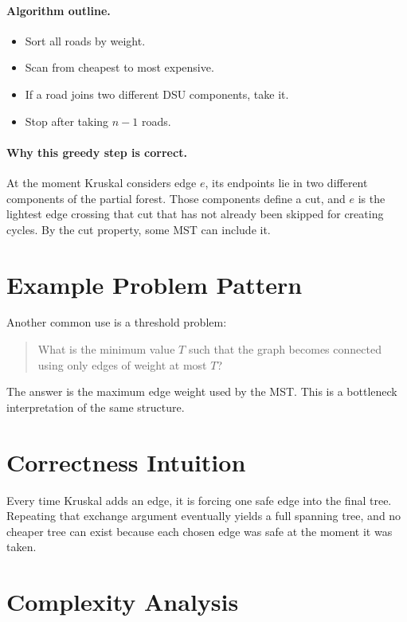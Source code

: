 \paragraph{Algorithm outline.}

\begin{itemize}
  \item Sort all roads by weight.
  \item Scan from cheapest to most expensive.
  \item If a road joins two different DSU components, take it.
  \item Stop after taking \(n-1\) roads.
\end{itemize}

\paragraph{Why this greedy step is correct.}
At the moment Kruskal considers edge \(e\), its endpoints lie in two different components of the partial forest. Those
components define a cut, and \(e\) is the lightest edge crossing that cut that has not already been skipped for creating
cycles. By the cut property, some MST can include it.

\section*{Example Problem Pattern}

Another common use is a threshold problem:

\begin{quote}
What is the minimum value \(T\) such that the graph becomes connected using only edges of weight at most \(T\)?
\end{quote}

The answer is the maximum edge weight used by the MST. This is a bottleneck interpretation of the same structure.

\section*{Correctness Intuition}

Every time Kruskal adds an edge, it is forcing one safe edge into the final tree. Repeating that exchange argument
eventually yields a full spanning tree, and no cheaper tree can exist because each chosen edge was safe at the moment it
was taken.

\section*{Complexity Analysis}

